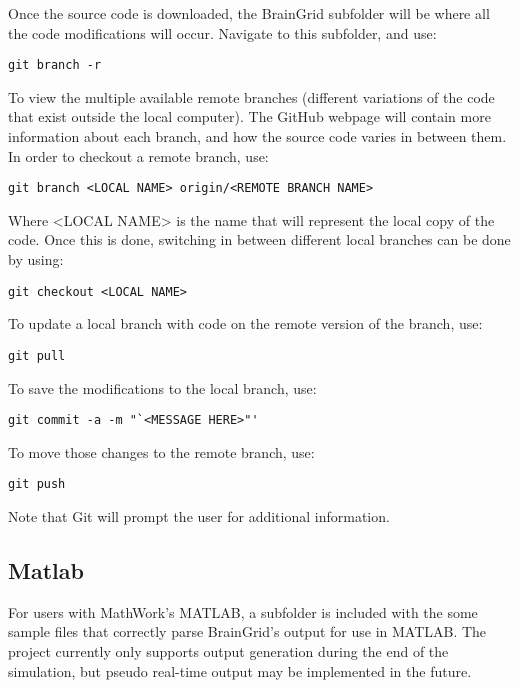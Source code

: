 \documentclass[11pt]{article}
\begin{document}
\noindent \mdseries Once the source code is downloaded, the BrainGrid subfolder will be where all the code modifications will occur. Navigate to this subfolder, and use:
\begin{verbatim}
git branch -r
\end{verbatim}

\noindent \mdseries To view the multiple available remote branches (different variations of the code that exist outside the local computer). The GitHub webpage will contain more information about each branch, and how the source code varies in between them. In order to checkout a remote branch, use:
\begin{verbatim}
git branch <LOCAL NAME> origin/<REMOTE BRANCH NAME>
\end{verbatim}

\noindent \mdseries Where <LOCAL NAME> is the name that will represent the local copy of the code. Once this is done, switching in between different local branches can be done by using:
\begin{verbatim}
git checkout <LOCAL NAME> 
\end{verbatim}

\noindent \mdseries To update a local branch with code on the remote version of the branch, use:
\begin{verbatim}
git pull
\end{verbatim}

\noindent \mdseries To save the modifications to the local branch, use:
\begin{verbatim}
git commit -a -m "`<MESSAGE HERE>"'
\end{verbatim}

\noindent \mdseries To move those changes to the remote branch, use:
\begin{verbatim}
git push
\end{verbatim}

\noindent \mdseries Note that Git will prompt the user for additional information.

\subsection{Matlab}
\mdseries For users with MathWork's MATLAB, a subfolder is included with the some sample files that correctly parse BrainGrid's output for use in MATLAB. The project currently only supports output generation during the end of the simulation, but pseudo real-time output may be implemented in the future.
\pagebreak
\end{document}
